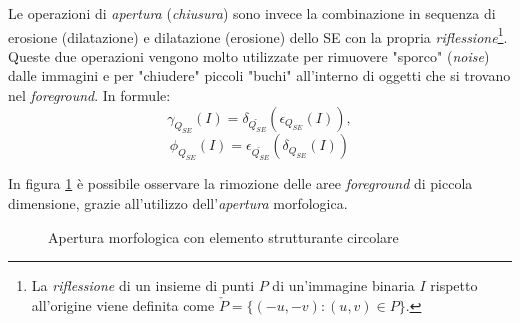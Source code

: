 Le operazioni di \textit{apertura} (\textit{chiusura}) sono invece la combinazione in sequenza di erosione (dilatazione) e dilatazione (erosione) dello SE con la propria \textit{riflessione}\footnote{La \textit{riflessione} di un insieme di punti $P$ di un'immagine binaria $I$ rispetto all'origine viene definita come $\check{P}=\{(-u,-v) \colon (u,v)\in P\}$.}. Queste due operazioni vengono molto utilizzate per rimuovere "sporco" (\textit{noise}) dalle immagini e per "chiudere" piccoli "buchi" all'interno di oggetti che si trovano nel \textit{foreground}. In formule:
\begin{equation}
	\label{eq:opening}
	\gamma_{Q_{SE}}(I) = \delta_{\check{Q_{SE}}}(\epsilon_{Q_{SE}}(I)),
\end{equation}
\begin{equation}
	\label{eq:closing}
	\phi_{Q_{SE}}(I) = \epsilon_{\check{Q_{SE}}}(\delta_{Q_{SE}}(I))
\end{equation}\par
In figura \ref{fig:opening} \`e possibile osservare la rimozione delle aree \textit{foreground} di piccola dimensione, grazie all'utilizzo dell'\textit{apertura} morfologica.
\begin{figure}[h]
	\centering
	\caption{Apertura morfologica con elemento strutturante circolare} \label{fig:opening}
\end{figure}

